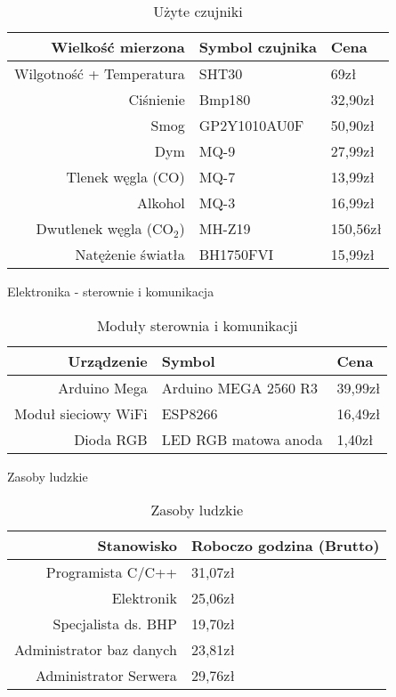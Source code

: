 \documentclass[10pt, a4paper]{article}
\begin{document}
\begin{table}[H]
		\centering
		\begin{tabular}{|r|l|l|} \hline
			\textbf{Wielkość mierzona} & \textbf{Symbol czujnika} & \textbf{Cena}\\
			\hline
			Wilgotność + Temperatura & SHT30 & 69zł \\
			Ciśnienie & Bmp180 & 32,90zł\\
			Smog & GP2Y1010AU0F & 50,90zł \\
			Dym & MQ-9 & 27,99zł \\
			Tlenek węgla (CO) & MQ-7 & 13,99zł\\
			Alkohol & MQ-3 & 16,99zł \\
			Dwutlenek węgla (CO$_2$) & MH-Z19 & 150,56zł\\
			Natężenie światła & BH1750FVI & 15,99zł\\ 
			\hline
		\end{tabular}
		\caption{Użyte czujniki}
		\label{tab:Czujniki}
	\end{table}

\begin{description}[font=$\bullet$~\normalfont]
\item Elektronika - sterownie i komunikacja
\end{description}

\begin{table}[H]
		\centering
		\begin{tabular}{|r|l|l|} \hline
			\textbf{Urządzenie} & \textbf{Symbol} & \textbf{Cena}\\
			\hline
			Arduino Mega & Arduino MEGA 2560 R3 & 39,99zł \\
			Moduł sieciowy WiFi & ESP8266 & 16,49zł\\
			Dioda RGB & LED RGB matowa anoda & 1,40zł \\ \hline
		\end{tabular}
		\caption{Moduły sterownia i komunikacji}
		\label{tab:Sterowanie}
	\end{table}
	
\begin{description}[font=$\bullet$~\normalfont]
\item Zasoby ludzkie
\end{description}

\begin{table}[H]
		\centering
		\begin{tabular}{|r|l|} \hline
			\textbf{Stanowisko} & \textbf{Roboczo godzina (Brutto)} \\
			\hline
			Programista C/C++ & 31,07zł\\
			Elektronik & 25,06zł\\
			Specjalista ds. BHP& 19,70zł\\ 
			Administrator baz danych & 23,81zł\\
			Administrator Serwera & 29,76zł\\ 
			\hline
		\end{tabular}
		\caption{Zasoby ludzkie}
		\label{tab:Ludzie}
	\end{table}
\end{document}

